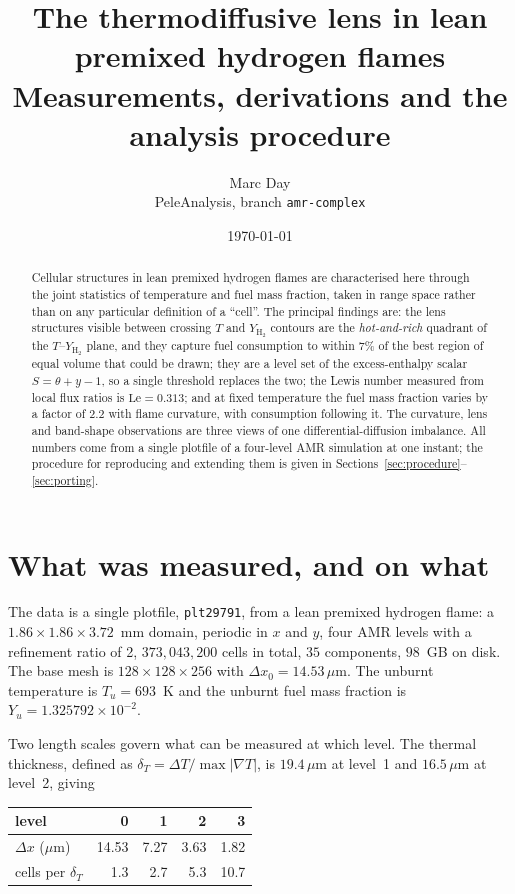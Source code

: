 \documentclass[11pt]{article}
\title{The thermodiffusive lens in lean premixed hydrogen flames\\
       \large Measurements, derivations and the analysis procedure}
\author{Marc Day\\\small PeleAnalysis, branch \texttt{amr-complex}}
\date{\today}
\newcommand{\YH}{Y_{\mathrm{H_2}}}
\newcommand{\Le}{\mathrm{Le}}
\newcommand{\grad}{\nabla}
\begin{document}
\maketitle

\begin{abstract}
Cellular structures in lean premixed hydrogen flames are characterised here
through the joint statistics of temperature and fuel mass fraction, taken in
range space rather than on any particular definition of a ``cell''. The
principal findings are: the lens structures visible between crossing $T$ and
$\YH$ contours are the \emph{hot-and-rich} quadrant of the $T$--$\YH$ plane,
and they capture fuel consumption to within $7\%$ of the best region of equal
volume that could be drawn; they are a level set of the excess-enthalpy scalar
$S = \theta + y - 1$, so a single threshold replaces the two; the Lewis number
measured from local flux ratios is $\Le = 0.313$; and at fixed temperature the
fuel mass fraction varies by a factor of $2.2$ with flame curvature, with
consumption following it. The curvature, lens and band-shape observations are
three views of one differential-diffusion imbalance. All numbers come from a
single plotfile of a four-level AMR simulation at one instant; the procedure
for reproducing and extending them is given in
Sections~\ref{sec:procedure}--\ref{sec:porting}.
\end{abstract}

\tableofcontents

\section{What was measured, and on what}
\label{sec:case}

The data is a single plotfile, \texttt{plt29791}, from a lean premixed
hydrogen flame: a $1.86 \times 1.86 \times 3.72$~mm domain, periodic in $x$
and $y$, four AMR levels with a refinement ratio of 2, $373{,}043{,}200$ cells
in total, $35$ components, $98$~GB on disk. The base mesh is
$128\times128\times256$ with $\Delta x_0 = 14.53\,\mu$m. The unburnt
temperature is $T_u = 693$~K and the unburnt fuel mass fraction is
$Y_u = 1.325792\times10^{-2}$.

Two length scales govern what can be measured at which level. The thermal
thickness, defined as $\delta_T = \Delta T / \max|\grad T|$, is
$19.4\,\mu$m at level~1 and $16.5\,\mu$m at level~2, giving

\begin{center}
\begin{tabular}{lrrrr}
\toprule
level & 0 & 1 & 2 & 3 \\
\midrule
$\Delta x$ ($\mu$m) & 14.53 & 7.27 & 3.63 & 1.82 \\
cells per $\delta_T$ & 1.3 & 2.7 & 5.3 & 10.7 \\
\bottomrule
\end{tabular}
\end{center}
\end{document}
